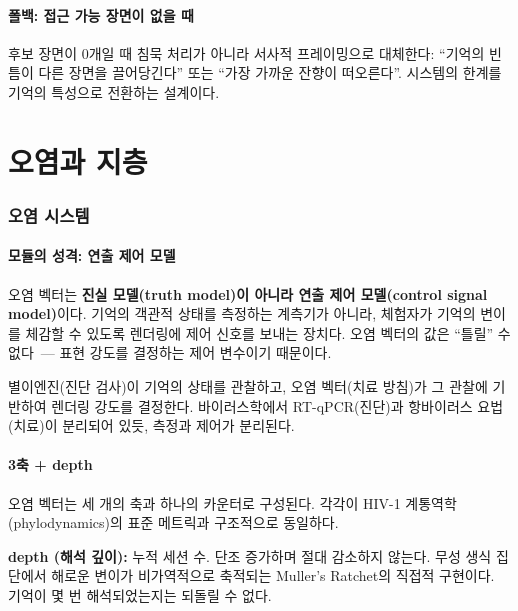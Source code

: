 \documentclass[11pt, a4paper]{article}
\begin{document}
\subsection{폴백: 접근 가능 장면이 없을 때}

후보 장면이 0개일 때 침묵 처리가 아니라 서사적 프레이밍으로 대체한다: ``기억의 빈틈이 다른 장면을 끌어당긴다'' 또는 ``가장 가까운 잔향이 떠오른다''. 시스템의 한계를 기억의 특성으로 전환하는 설계이다.



\part{오염과 지층}

\section{오염 시스템}

\subsection{모듈의 성격: 연출 제어 모델}

오염 벡터는 \textbf{진실 모델(truth model)이 아니라 연출 제어 모델(control signal model)}이다. 기억의 객관적 상태를 측정하는 계측기가 아니라, 체험자가 기억의 변이를 체감할 수 있도록 렌더링에 제어 신호를 보내는 장치다. 오염 벡터의 값은 ``틀릴'' 수 없다~--- 표현 강도를 결정하는 제어 변수이기 때문이다.

별이엔진(진단 검사)이 기억의 상태를 관찰하고, 오염 벡터(치료 방침)가 그 관찰에 기반하여 렌더링 강도를 결정한다. 바이러스학에서 RT-qPCR(진단)과 항바이러스 요법(치료)이 분리되어 있듯, 측정과 제어가 분리된다.

\subsection{3축 + depth}

오염 벡터는 세 개의 축과 하나의 카운터로 구성된다. 각각이 HIV-1 계통역학(phylodynamics)의 표준 메트릭과 구조적으로 동일하다.

\textbf{depth (해석 깊이):} 누적 세션 수. 단조 증가하며 절대 감소하지 않는다. 무성 생식 집단에서 해로운 변이가 비가역적으로 축적되는 Muller's Ratchet\cite{muller1964}의 직접적 구현이다. 기억이 몇 번 해석되었는지는 되돌릴 수 없다.
\end{document}
